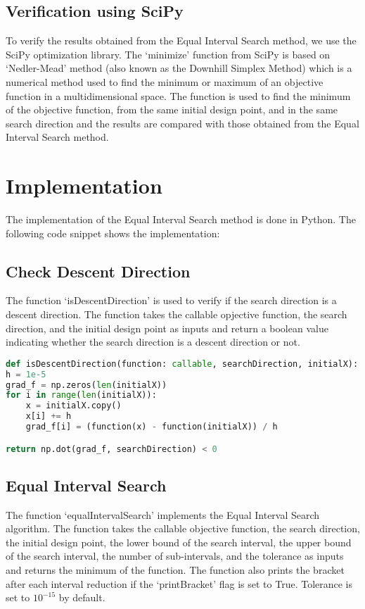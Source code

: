 \documentclass[11pt,a4paper]{article}
\begin{document}
\subsection{Verification using SciPy}
To verify the results obtained from the Equal Interval Search method, we use the SciPy optimization library. The `minimize' function from SciPy is
based on `Nedler-Mead' method (also known as the Downhill Simplex Method) which is a numerical method used to find the minimum or maximum of an objective function in a multidimensional space. The function is used to find the minimum of the objective function, from the same initial design point, and in the same search direction and the results are compared with those obtained from the Equal Interval Search method.

\section{Implementation}
The implementation of the Equal Interval Search method is done in Python. The following code snippet shows the implementation:

\subsection{Check Descent Direction}
The function `isDescentDirection' is used to verify if the search direction is a descent direction. The function takes the callable opjective function, the search direction, and the initial design point as inputs and return a boolean value indicating whether the search direction is a descent direction or not.

\begin{lstlisting}[language=Python]
def isDescentDirection(function: callable, searchDirection, initialX):
h = 1e-5
grad_f = np.zeros(len(initialX))
for i in range(len(initialX)):
    x = initialX.copy()
    x[i] += h
    grad_f[i] = (function(x) - function(initialX)) / h

return np.dot(grad_f, searchDirection) < 0
\end{lstlisting}

\subsection{Equal Interval Search}
The function `equalIntervalSearch' implements the Equal Interval Search algorithm. The function takes the callable objective function, the search direction, the initial design point, the lower bound of the search interval, the upper bound of the search interval, the number of sub-intervals, and the tolerance as inputs and returns the minimum of the function. The function also prints the bracket after each interval reduction if the `printBracket' flag is set to True. Tolerance is set to \(10^{-15}\) by default.
\end{document}
